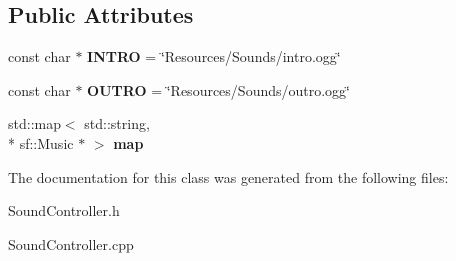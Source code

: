 \subsection*{Public Attributes}
\begin{DoxyCompactItemize}
\item 
\hypertarget{class_sound_controller_afff78ac7ad87e197d22e956efd9da7fc}{const char $\ast$ {\bfseries I\+N\+T\+R\+O} = \char`\"{}Resources/Sounds/intro.\+ogg\char`\"{}}\label{class_sound_controller_afff78ac7ad87e197d22e956efd9da7fc}

\item 
\hypertarget{class_sound_controller_a611eafe07f5f5a46a9a4f472ec2b588e}{const char $\ast$ {\bfseries O\+U\+T\+R\+O} = \char`\"{}Resources/Sounds/outro.\+ogg\char`\"{}}\label{class_sound_controller_a611eafe07f5f5a46a9a4f472ec2b588e}

\item 
\hypertarget{class_sound_controller_a14d67f50bd484514058427f7a083101a}{std\+::map$<$ std\+::string, \\*
sf\+::\+Music $\ast$ $>$ {\bfseries map}}\label{class_sound_controller_a14d67f50bd484514058427f7a083101a}

\end{DoxyCompactItemize}


The documentation for this class was generated from the following files\+:\begin{DoxyCompactItemize}
\item 
Sound\+Controller.\+h\item 
Sound\+Controller.\+cpp\end{DoxyCompactItemize}
